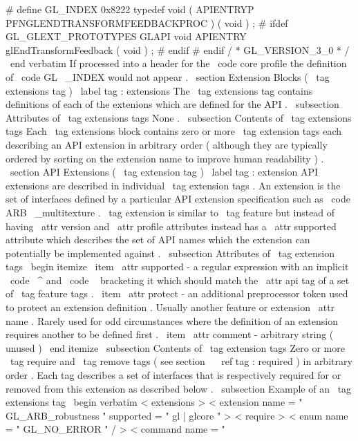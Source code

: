 #
define
GL_INDEX
0x8222
typedef
void
(
APIENTRYP
PFNGLENDTRANSFORMFEEDBACKPROC
)
(
void
)
;
#
ifdef
GL_GLEXT_PROTOTYPES
GLAPI
void
APIENTRY
glEndTransformFeedback
(
void
)
;
#
endif
#
endif
/
*
GL_VERSION_3_0
*
/
\
end
{
verbatim
}
If
processed
into
a
header
for
the
\
code
{
core
}
profile
the
definition
of
\
code
{
GL
\
_INDEX
}
would
not
appear
.
\
section
{
Extension
Blocks
(
\
tag
{
extensions
}
tag
)
}
\
label
{
tag
:
extensions
}
The
\
tag
{
extensions
}
tag
contains
definitions
of
each
of
the
extenions
which
are
defined
for
the
API
.
\
subsection
{
Attributes
of
\
tag
{
extensions
}
tags
}
None
.
\
subsection
{
Contents
of
\
tag
{
extensions
}
tags
}
Each
\
tag
{
extensions
}
block
contains
zero
or
more
\
tag
{
extension
}
tags
each
describing
an
API
extension
in
arbitrary
order
(
although
they
are
typically
ordered
by
sorting
on
the
extension
name
to
improve
human
readability
)
.
\
section
{
API
Extensions
(
\
tag
{
extension
}
tag
)
}
\
label
{
tag
:
extension
}
API
extensions
are
described
in
individual
\
tag
{
extension
}
tags
.
An
extension
is
the
set
of
interfaces
defined
by
a
particular
API
extension
specification
such
as
\
code
{
ARB
\
_multitexture
}
.
\
tag
{
extension
}
is
similar
to
\
tag
{
feature
}
but
instead
of
having
\
attr
{
version
}
and
\
attr
{
profile
}
attributes
instead
has
a
\
attr
{
supported
}
attribute
which
describes
the
set
of
API
names
which
the
extension
can
potentially
be
implemented
against
.
\
subsection
{
Attributes
of
\
tag
{
extension
}
tags
}
\
begin
{
itemize
}
\
item
\
attr
{
supported
}
-
a
regular
expression
with
an
implicit
\
code
{
\
^
{
}
}
and
\
code
{
\
}
bracketing
it
which
should
match
the
\
attr
{
api
}
tag
of
a
set
of
\
tag
{
feature
}
tags
.
\
item
\
attr
{
protect
}
-
an
additional
preprocessor
token
used
to
protect
an
extension
definition
.
Usually
another
feature
or
extension
\
attr
{
name
}
.
Rarely
used
for
odd
circumstances
where
the
definition
of
an
extension
requires
another
to
be
defined
first
.
\
item
\
attr
{
comment
}
-
arbitrary
string
(
unused
)
\
end
{
itemize
}
\
subsection
{
Contents
of
\
tag
{
extension
}
tags
}
Zero
or
more
\
tag
{
require
}
and
\
tag
{
remove
}
tags
(
see
section
~
\
ref
{
tag
:
required
}
)
in
arbitrary
order
.
Each
tag
describes
a
set
of
interfaces
that
is
respectively
required
for
or
removed
from
this
extension
as
described
below
.
\
subsection
{
Example
of
an
\
tag
{
extensions
}
tag
}
\
begin
{
verbatim
}
<
extensions
>
<
extension
name
=
"
GL_ARB_robustness
"
supported
=
"
gl
|
glcore
"
>
<
require
>
<
enum
name
=
"
GL_NO_ERROR
"
/
>
<
command
name
=
"
